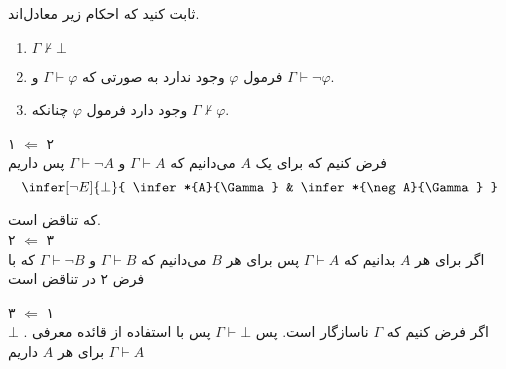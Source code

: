 
		ثابت کنید که احکام زیر معادل‌اند.
		 \begin{enumerate}
		 	\item $\Gamma\nvdash \bot$	
		 	\item فرمول
		 	$\varphi$
		 	وجود ندارد به صورتی که 
		 	$\Gamma \vdash \varphi$ 
		 	و
		 	$\Gamma \vdash \neg \varphi$.
		 	
		 	\item وجود دارد فرمول
			$\varphi$
			چنانکه $\Gamma \nvdash \varphi$.
		 	
		 \end{enumerate}
		 
	\quad\vspace {-0.5 cm}
	\begin{ans}
		۱ $\Leftarrow$ ۲ \\
		 فرض کنیم که برای یک $A$ می‌دانیم که
		 $\Gamma \vdash A$
		 و 
		 $\Gamma \vdash \neg A$
		 پس داریم
		 $$
		 	\infer[\neg E]{\bot}{
		 		\infer*{A}{\Gamma}
		 		&
		 		\infer*{\neg A}{\Gamma}
		 	}	
		 $$ 

که تناقض است.\\
		۲ $\Leftarrow$ ۳ \\
		اگر برای هر 
		$A$
		بدانیم که
		$\Gamma \vdash A$
		پس برای هر 
		$B$
		می‌دانیم که 
		$\Gamma \vdash B$ و
		$\Gamma \vdash \neg B$
		که با فرض ۲ در تناقض است
		
		۳ $\Leftarrow$ ۱ \\
		اگر فرض کنیم که 
  $\Gamma$ 
  ناسازگار است.
  پس
		$\Gamma \vdash \bot$
		پس با استفاده از قائده معرفی . 
  $\bot$
  برای هر
  $A$
  داریم
		$\Gamma \vdash A$
		 
	\end{ans}

